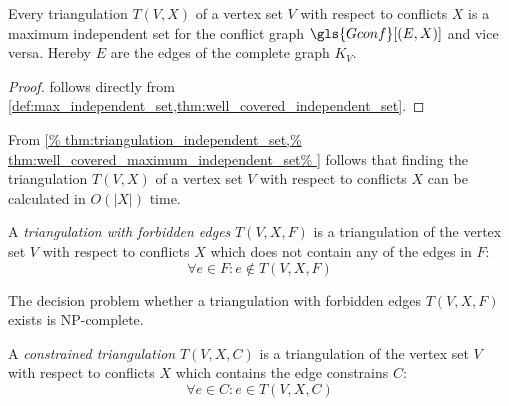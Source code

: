

\begin{theorem}
  \label{thm:triangulation_independent_set}
  Every triangulation \(T(V,X)\) of a vertex set \(V\) with respect
  to conflicts \(X\) is a maximum independent set for the conflict
  graph \(\gls{Gconf}[(E,X)]\) and vice versa. Hereby \(E\) are the
  edges of the complete graph \(K_V\).
\end{theorem}

\begin{proof}
   follows directly from
  \cref{def:max_independent_set,thm:well_covered_independent_set}.
\end{proof}

\begin{theorem}
  From
  \cref{%
    thm:triangulation_independent_set,%
    thm:well_covered_maximum_independent_set%
  }
  follows that finding the triangulation \(T(V,X)\) of a vertex set
  \(V\) with respect to conflicts \(X\) can be calculated in
  \(O(|X|)\) time.
\end{theorem}


\begin{definition}
  A \emph{triangulation with forbidden edges} \(T(V,X,F)\) is a 
  triangulation of the vertex set \(V\) with respect to conflicts
  \(X\) which does not contain any of the edges in \(F\):
  \[ \forall e \in F : e \not\in T(V,X,F) \]
\end{definition}


\begin{theorem}
  The decision problem whether a triangulation with forbidden edges
  \(T(V,X,F)\) exists is NP-complete.
  \cite[triangulation existence problem]{triangulation_forbidden_edges}
\end{theorem}


\begin{definition}
  \label{def:constrained_triangulation}
  A \emph{constrained triangulation} \(T(V,X,C)\) is a triangulation
  of the vertex set \(V\) with respect to conflicts \(X\) which 
  contains the edge constrains \(C\):
  \[ \forall e \in C : e \in T(V,X,C) \]
\end{definition}

